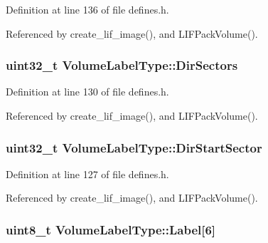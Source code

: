 Definition at line 136 of file defines.\+h.



Referenced by create\+\_\+lif\+\_\+image(), and L\+I\+F\+Pack\+Volume().

\subsubsection[{\texorpdfstring{Dir\+Sectors}{DirSectors}}]{\setlength{\rightskip}{0pt plus 5cm}uint32\+\_\+t Volume\+Label\+Type\+::\+Dir\+Sectors}\hypertarget{structVolumeLabelType_a11e35931a035c61cddc1fa20898e9466}{}\label{structVolumeLabelType_a11e35931a035c61cddc1fa20898e9466}


Definition at line 130 of file defines.\+h.



Referenced by create\+\_\+lif\+\_\+image(), and L\+I\+F\+Pack\+Volume().

\subsubsection[{\texorpdfstring{Dir\+Start\+Sector}{DirStartSector}}]{\setlength{\rightskip}{0pt plus 5cm}uint32\+\_\+t Volume\+Label\+Type\+::\+Dir\+Start\+Sector}\hypertarget{structVolumeLabelType_aa74d0d5a4d248e42b2eb2fb95dcad4a6}{}\label{structVolumeLabelType_aa74d0d5a4d248e42b2eb2fb95dcad4a6}


Definition at line 127 of file defines.\+h.



Referenced by create\+\_\+lif\+\_\+image(), and L\+I\+F\+Pack\+Volume().

\subsubsection[{\texorpdfstring{Label}{Label}}]{\setlength{\rightskip}{0pt plus 5cm}uint8\+\_\+t Volume\+Label\+Type\+::\+Label\mbox{[}6\mbox{]}}\hypertarget{structVolumeLabelType_ad8724768576a8eb4d697597ae9b90c21}{}\label{structVolumeLabelType_ad8724768576a8eb4d697597ae9b90c21}


